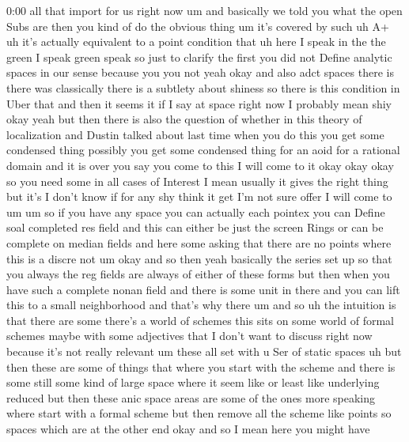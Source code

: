 \begin{unfinished}{0:00}
all  that  import  for  us  right  now  um  and
basically  we  told  you  what  the  open  Subs
are  then  you  kind  of  do  the  obvious
thing
um  it's  covered  by  such  uh  A+
uh  it's  actually  equivalent  to  a  point
condition  that  uh  here  I  speak  in  the
the  green  I  speak  green  speak  so  just  to
clarify  the  first
you  did  not  Define  analytic  spaces  in
our  sense  because  you  you
not  yeah  okay  and  also  adct  spaces  there
is  there  was  classically  there  is  a
subtlety  about  shiness  so  there  is  this
condition  in  Uber  that  and  then  it  seems
it  if  I  say  at  space  right  now  I
probably  mean  shiy  okay  yeah  but  then
there  is  also  the  question  of  whether  in
this  theory  of  localization  and  Dustin
talked  about  last  time  when  you  do  this
you  get  some  condensed  thing
possibly  you  get  some  condensed  thing
for  an  aoid  for  a  rational  domain  and  it
is
over  you
say  you  come  to  this  I  will  come  to  it
okay  okay  okay  so  you  need  some  in  all
cases  of  Interest  I  mean  usually  it
gives  the  right  thing  but  it's  I  don't
know  if  for  any  shy  think  it  get  I'm  not
sure  offer  I  will  come
to
um  um  so  if  you  have  any  space  you  can
actually  each  pointex  you  can  Define
soal  completed  res  field  and  this  can
either  be  just  the  screen  Rings  or  can
be  complete  on  median  fields  and  here
some  asking  that  there  are  no  points
where  this  is  a
discre
not
um  okay  and  so  then  yeah  basically  the
series  set  up  so  that  you  always  the  reg
fields  are  always  of  either  of  these
forms  but  then  when  you  have  such  a
complete  nonan  field  and  there  is  some
unit  in  there  and  you  can  lift  this  to  a
small  neighborhood  and  that's  why
there
um  and
so  uh  the
intuition
is  that  there  are  some  there's  a  world
of  schemes  this  sits  on  some  world  of
formal
schemes  maybe  with  some  adjectives  that
I  don't  want  to  discuss  right  now
because  it's  not  really  relevant  um
these  all  set  with  u  Ser  of  static
spaces  uh  but  then  these  are  some  of
things  that  where  you  start  with  the
scheme  and  there  is  some  still  some  kind
of  large  space  where  it  seem  like  or
least  like  underlying  reduced  but  then
these  anic  space  areas  are  some  of  the
ones  more  speaking  where  start  with  a
formal  scheme  but  then  remove  all  the
scheme  like  points
so  spaces  which  are  at  the  other
end
okay  and  so  I  mean  here  you  might  have

\end{unfinished}
